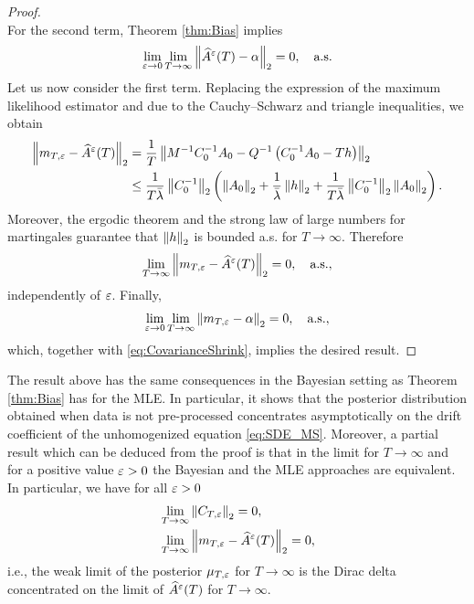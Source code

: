 \documentclass[10pt]{article}
\begin{document}
\begin{proof}
\begin{equation}
	\end{equation}
	For the second term, Theorem \ref{thm:Bias} implies 
	\begin{equation}
		\lim_{\varepsilon \to 0} \lim_{T \to \infty}\left\|\widehat A^\varepsilon(T) - \alpha\right\|_2 = 0, \quad \text{a.s.}
	\end{equation}
	Let us now consider the first term.	Replacing the expression of the maximum likelihood estimator and due to the Cauchy--Schwarz and triangle inequalities, we obtain
	\begin{equation}
	\begin{aligned}
		\left\|m_{T,\varepsilon} - \widehat A^\varepsilon(T)\right\|_2 &= \frac1T\left\|M^{-1}C_0^{-1}A_0 - Q^{-1}\left(C_0^{-1}A_0 - Th \right)\right\|_2\\
		&\leq \frac1{T\bar \lambda} \left\|C_0^{-1}\right\|_2 \left(\left\|A_0\right\|_2 + \frac1{\bar \lambda}\left\|h\right\|_2 + \frac1{T\bar \lambda} \left\|C_0^{-1}\right\|_2\left\|A_0\right\|_2\right).
	\end{aligned}
	\end{equation}
	Moreover, the ergodic theorem and the strong law of large numbers for martingales guarantee that $\left\|h\right\|_2$ is bounded a.s. for $T \to \infty$. Therefore
	\begin{equation}
	\lim_{T\to\infty} \left\|m_{T,\varepsilon} - \widehat A^\varepsilon(T)\right\|_2 = 0, \quad \text{a.s.},
	\end{equation}
	independently of $\varepsilon$. Finally, 
	\begin{equation}
		\lim_{\varepsilon \to 0} \lim_{T \to \infty}\left\|m_{T,\varepsilon} - \alpha\right\|_2 = 0, \quad \text{a.s.},
	\end{equation}
	which, together with \eqref{eq:CovarianceShrink}, implies the desired result. 
\end{proof}

\begin{remark} The result above has the same consequences in the Bayesian setting as Theorem \ref{thm:Bias} has for the MLE. In particular, it shows that the posterior distribution obtained when data is not pre-processed concentrates asymptotically on the drift coefficient of the unhomogenized equation \eqref{eq:SDE_MS}. Moreover, a partial result which can be deduced from the proof is that in the limit for $T \to \infty$ and for a positive value $\varepsilon > 0$ the Bayesian and the MLE approaches are equivalent. In particular, we have for all $\varepsilon > 0$
	\begin{equation}
	\begin{aligned}
		&\lim_{T\to\infty} \left\|C_{T,\varepsilon}\right\|_2 = 0,\\
		&\lim_{T \to\infty}\left\|m_{T,\varepsilon} - \widehat A^\varepsilon(T)\right\|_2 =0,
	\end{aligned}	
	\end{equation} 
	i.e., the weak limit of the posterior $\mu_{T,\varepsilon}$ for $T\to \infty$ is the Dirac delta concentrated on the limit of $\widehat A^\varepsilon(T)$ for $T\to \infty$. 
\end{remark}
\end{document}
